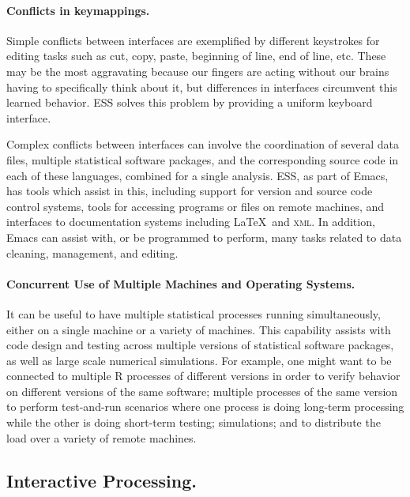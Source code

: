 \documentclass{article}
\begin{document}
\paragraph{Conflicts in keymappings.}
\label{sec:confl-keym}

Simple conflicts between interfaces are exemplified by different
keystrokes for editing tasks such as cut, copy, paste, beginning of
line, end of line, etc.  These may be the most aggravating
because our fingers are acting without our brains having to
specifically think about it, but differences in interfaces
circumvent this learned behavior.  ESS solves this problem by
providing a uniform keyboard interface.

Complex conflicts between interfaces can involve the coordination of
several data files, multiple statistical software packages, and the
corresponding source code in each of these languages, combined for a
single analysis.  ESS, as part of Emacs, has tools which assist in
this, including support for version and source code control systems,
tools for accessing programs or files on remote machines, and
interfaces to documentation systems including \LaTeX\ and
\textsc{xml}.  In addition, Emacs can assist with, or be programmed to
perform, many tasks related to data cleaning, management, and editing.


\paragraph{Concurrent Use of Multiple Machines and Operating Systems.}
\label{sec:conc-use-mult}

It can be useful to have multiple statistical processes running
simultaneously, either on a single machine or a variety of machines.
This capability assists with code design and testing across multiple
versions of statistical software packages, as well as large scale
numerical simulations.  For example, one might want to be connected to
multiple R processes of different versions in order to verify behavior
on different versions of the same software; multiple processes of the
same version to perform test-and-run scenarios where one process is
doing long-term processing while the other is doing short-term
testing; simulations; and to distribute the load over a variety of
remote machines.

\subsection{Interactive Processing.}
\label{sec:interactive}
\end{document}
